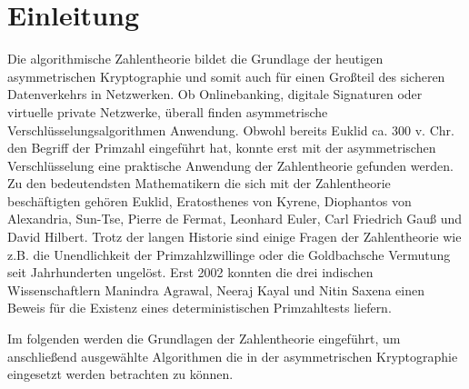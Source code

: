 \section{Einleitung}
	Die algorithmische Zahlentheorie bildet die Grundlage der heutigen asymmetrischen Kryptographie und somit auch für einen Großteil des sicheren Datenverkehrs in Netzwerken. Ob Onlinebanking, digitale Signaturen oder virtuelle private Netzwerke, überall finden asymmetrische Verschlüsselungsalgorithmen Anwendung. Obwohl bereits Euklid ca. 300 v. Chr. den Begriff der Primzahl eingeführt hat, konnte erst mit der asymmetrischen Verschlüsselung eine praktische Anwendung der Zahlentheorie gefunden werden. Zu den bedeutendsten Mathematikern die sich mit der Zahlentheorie beschäftigten gehören Euklid, Eratosthenes von Kyrene, Diophantos von Alexandria, Sun-Tse, Pierre de Fermat, Leonhard Euler, Carl Friedrich Gauß und David Hilbert. Trotz der langen Historie sind einige Fragen der Zahlentheorie wie z.B. die Unendlichkeit der Primzahlzwillinge oder die Goldbachsche Vermutung seit Jahrhunderten ungelöst. Erst 2002
	konnten die drei indischen Wissenschaftlern Manindra Agrawal, Neeraj Kayal und Nitin Saxena einen Beweis für die Existenz eines deterministischen Primzahltests liefern.
	
	Im folgenden werden die Grundlagen der Zahlentheorie eingeführt, um anschließend ausgewählte Algorithmen die in der asymmetrischen Kryptographie eingesetzt werden betrachten zu können.
	
	 